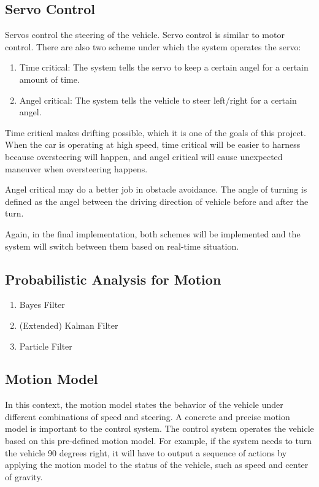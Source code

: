 \documentclass[compsoc,draftclsnofoot,onecolumn,10pt]{IEEEtran}
\begin{document}
\subsection{Servo Control}
Servos control the steering of the vehicle. Servo control is similar to motor control. 
There are also two scheme under which the system operates the servo:
\begin{enumerate}
\item Time critical: The system tells the servo to keep a certain angel for a certain 
amount of time.
\item Angel critical: The system tells the vehicle to steer left/right for a certain 
angel. 
\end{enumerate}
Time critical makes drifting possible, which it is one of the goals of this project. 
When the car is operating at high speed, time critical will be easier to harness because 
oversteering will happen, and angel critical will cause unexpected maneuver when 
oversteering happens.\par

Angel critical may do a better job in obstacle avoidance. The angle of turning is defined 
as the angel between the driving direction of vehicle before and after the turn.\par

Again, in the final implementation, both schemes will be implemented and the system will 
switch between them based on real-time situation.\par

\subsection{Probabilistic Analysis for Motion}
\begin{enumerate}
\item Bayes Filter
\item (Extended) Kalman Filter
\item Particle Filter
\end{enumerate}

\subsection{Motion Model}
In this context, the motion model states the behavior of the vehicle under different 
combinations of speed and steering. A concrete and precise motion model is important to 
the control system. The control system operates the vehicle based on this pre-defined 
motion model. For example, if the system needs to turn the vehicle 90 degrees right, it 
will have to output a sequence of actions by applying the motion model to the status of 
the vehicle, such as speed and center of gravity.\par
\end{document}

